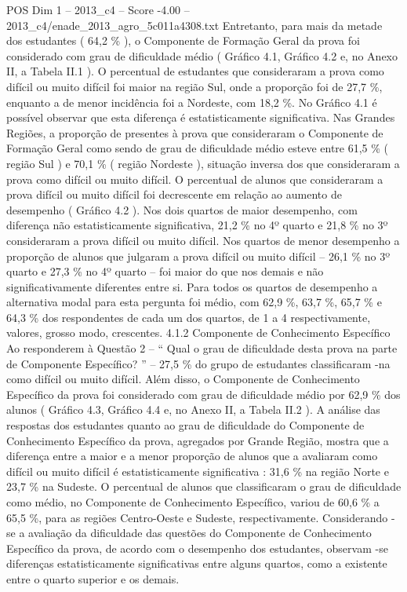 \begin{textsample}{POS Dim 1 – 2013\_c4 – Score -4.00 – 2013\_c4/enade\_2013\_agro\_5c011a4308.txt}
Entretanto, para mais da metade dos estudantes ( 64,2 \% ), o Componente de Formação Geral da prova foi considerado com grau de dificuldade médio ( Gráfico 4.1, Gráfico 4.2 e, no Anexo II, a Tabela II.1 ).
O percentual de estudantes que consideraram a prova como difícil ou muito difícil foi maior na região Sul, onde a proporção foi de 27,7 \%, enquanto a de menor incidência foi a Nordeste, com 18,2 \%.
No Gráfico 4.1 é possível observar que esta diferença é estatisticamente significativa.
Nas Grandes Regiões, a proporção de presentes à prova que consideraram o Componente de Formação Geral como sendo de grau de dificuldade médio esteve entre 61,5 \% ( região Sul ) e 70,1 \% ( região Nordeste ), situação inversa dos que consideraram a prova como difícil ou muito difícil.
O percentual de alunos que consideraram a prova difícil ou muito difícil foi decrescente em relação ao aumento de desempenho ( Gráfico 4.2 ).
Nos dois quartos de maior desempenho, com diferença não estatisticamente significativa, 21,2 \% no 4º quarto e 21,8 \% no 3º consideraram a prova difícil ou muito difícil.
Nos quartos de menor desempenho a proporção de alunos que julgaram a prova difícil ou muito difícil – 26,1 \% no 3º quarto e 27,3 \% no 4º quarto – foi maior do que nos demais e não significativamente diferentes entre si.
Para todos os quartos de desempenho a alternativa modal para esta pergunta foi médio, com 62,9 \%, 63,7 \%, 65,7 \% e 64,3 \% dos respondentes de cada um dos quartos, de 1 a 4 respectivamente, valores, grosso modo, crescentes. 4.1.2 Componente de Conhecimento Específico Ao responderem à Questão 2 – “ Qual o grau de dificuldade desta prova na parte de Componente Específico? ” – 27,5 \% do grupo de estudantes classificaram -na como difícil ou muito difícil.
Além disso, o Componente de Conhecimento Específico da prova foi considerado com grau de dificuldade médio por 62,9 \% dos alunos ( Gráfico 4.3, Gráfico 4.4 e, no Anexo II, a Tabela II.2 ).
A análise das respostas dos estudantes quanto ao grau de dificuldade do Componente de Conhecimento Específico da prova, agregados por Grande Região, mostra que a diferença entre a maior e a menor proporção de alunos que a avaliaram como difícil ou muito difícil é estatisticamente significativa : 31,6 \% na região Norte e 23,7 \% na Sudeste.
O percentual de alunos que classificaram o grau de dificuldade como médio, no Componente de Conhecimento Específico, variou de 60,6 \% a 65,5 \%, para as regiões Centro-Oeste e Sudeste, respectivamente.
Considerando -se a avaliação da dificuldade das questões do Componente de Conhecimento Específico da prova, de acordo com o desempenho dos estudantes, observam -se diferenças estatisticamente significativas entre alguns quartos, como a existente entre o quarto superior e os demais.

\end{textsample}
